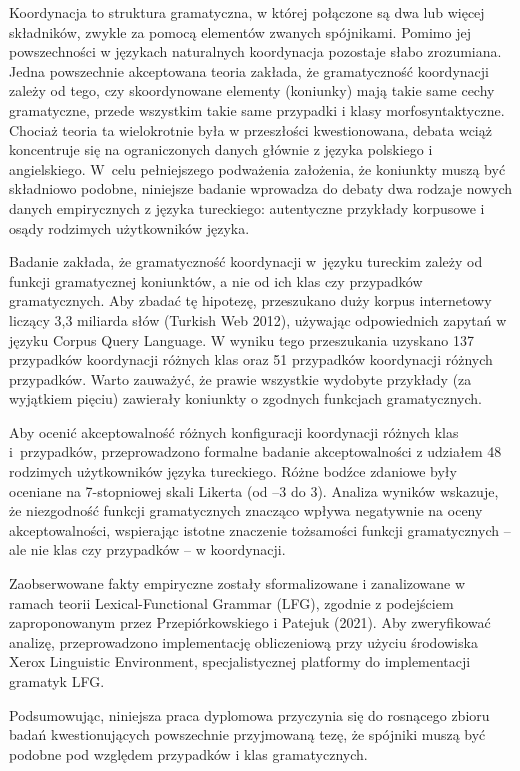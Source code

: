 \begin{sloppypar}
\begin{small}
Koordynacja to struktura gramatyczna, w której połączone są dwa lub więcej składników, zwykle za pomocą elementów zwanych spójnikami. Pomimo jej powszechności w językach naturalnych koordynacja pozostaje słabo zrozumiana. Jedna powszechnie akceptowana teoria zakłada, że gramatyczność koordynacji zależy od tego, czy skoordynowane elementy (koniunky) mają takie same cechy gramatyczne, przede wszystkim takie same przypadki i klasy morfosyntaktyczne. Chociaż teoria ta wielokrotnie była w przeszłości kwestionowana, debata wciąż koncentruje się na ograniczonych danych głównie z języka polskiego i angielskiego. W~celu pełniejszego podważenia założenia, że koniunkty muszą być składniowo podobne, niniejsze badanie wprowadza do debaty dwa rodzaje nowych danych empirycznych z języka tureckiego: autentyczne przykłady korpusowe i osądy rodzimych użytkowników języka.

Badanie zakłada, że gramatyczność koordynacji w~języku tureckim zależy od funkcji gramatycznej koniunktów, a nie od ich klas czy przypadków gramatycznych. Aby zbadać tę hipotezę, przeszukano duży korpus internetowy liczący 3,3 miliarda słów (Turkish Web 2012), używając odpowiednich zapytań w języku Corpus Query Language. W wyniku tego przeszukania uzyskano 137 przypadków koordynacji różnych klas oraz 51 przypadków koordynacji różnych przypadków. Warto zauważyć, że prawie wszystkie wydobyte przykłady (za wyjątkiem pięciu) zawierały koniunkty o zgodnych funkcjach gramatycznych.

Aby ocenić akceptowalność różnych konfiguracji koordynacji różnych klas i~przypadków, przeprowadzono formalne badanie akceptowalności z udziałem 48 rodzimych użytkowników języka tureckiego. Różne bodźce zdaniowe były oceniane na 7-stopniowej skali Likerta (od –3 do 3). Analiza wyników wskazuje, że niezgodność funkcji gramatycznych znacząco wpływa negatywnie na oceny akceptowalności, wspierając istotne znaczenie tożsamości funkcji gramatycznych – ale nie klas czy przypadków – w koordynacji.

Zaobserwowane fakty empiryczne zostały sformalizowane i zanalizowane w ramach teorii Lexical-Functional Grammar (LFG), zgodnie z podejściem zaproponowanym przez Przepiórkowskiego i Patejuk (2021). Aby zweryfikować analizę, przeprowadzono implementację obliczeniową przy użyciu środowiska Xerox Linguistic Environment, specjalistycznej platformy do implementacji gramatyk LFG.

Podsumowując, niniejsza praca dyplomowa przyczynia się do rosnącego zbioru badań kwestionujących powszechnie przyjmowaną tezę, że spójniki muszą być podobne pod względem przypadków i klas gramatycznych. %
\end{small}
\end{sloppypar}